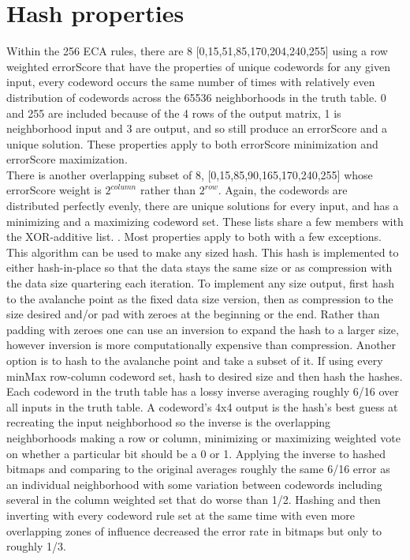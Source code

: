 \documentclass[11pt]{article}
\begin{document}
\section{Hash properties}

Within the 256 ECA rules, there are 8 [0,15,51,85,170,204,240,255] using a row weighted errorScore that have the properties of unique codewords for any given input, every codeword occurs the same number of times with relatively even distribution of codewords across the 65536 neighborhoods in the truth table. 0 and 255 are included because of the 4 rows of the output matrix, 1 is neighborhood input and 3 are output, and so still produce an errorScore and a unique solution. These properties apply to both errorScore minimization and errorScore maximization. \\

There is another overlapping subset of 8, [0,15,85,90,165,170,240,255] whose errorScore weight is $2^{column}$ rather than $2^{row}$. Again, the codewords are distributed perfectly evenly, there are unique solutions for every input, and has a minimizing and a maximizing codeword set. These lists share a few members with the XOR-additive list. \cite{xorAdditive}. Most properties apply to both with a few exceptions.\\

This algorithm can be used to make any sized hash. This hash is implemented to either hash-in-place so that the data stays the same size or as compression with the data size quartering each iteration. To implement any size output, first hash to the avalanche point as the fixed data size version, then as compression to the size desired and/or pad with zeroes at the beginning or the end. Rather than padding with zeroes one can use an inversion to expand the hash to a larger size, however inversion is more computationally expensive than compression. Another option is to hash to the avalanche point and take a subset of it. If using every minMax row-column codeword set, hash to desired size and then hash the hashes.\\

Each codeword in the truth table has a lossy inverse averaging roughly 6/16 over all inputs in the truth table. A codeword's 4x4 output is the hash's best guess at recreating the input neighborhood so the inverse is the overlapping neighborhoods making a row or column, minimizing or maximizing weighted vote on whether a particular bit should be a 0 or 1. Applying the inverse to hashed bitmaps and comparing to the original averages roughly the same 6/16 error as an individual neighborhood with some variation between codewords including several in the column weighted set that do worse than 1/2. Hashing and then inverting with every codeword rule set at the same time with even more overlapping zones of influence decreased the error rate in bitmaps but only to roughly 1/3. \\
\end{document}
